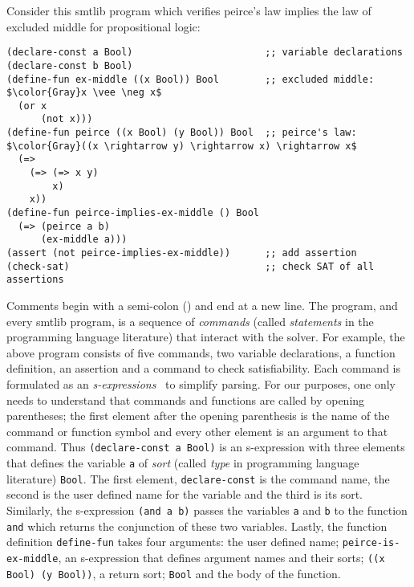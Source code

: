 Consider this \acl{smtlib} program
which verifies peirce's law implies the law of excluded middle for propositional
logic:
%
\begin{lstlisting}[columns=flexible,keepspaces=true,language=SMTLIB]
(declare-const a Bool)                       ;; variable declarations
(declare-const b Bool)
(define-fun ex-middle ((x Bool)) Bool        ;; excluded middle: $\color{Gray}x \vee \neg x$
  (or x
      (not x)))
(define-fun peirce ((x Bool) (y Bool)) Bool  ;; peirce's law: $\color{Gray}((x \rightarrow y) \rightarrow x) \rightarrow x$
  (=>
    (=> (=> x y)
        x)
    x))
(define-fun peirce-implies-ex-middle () Bool
  (=> (peirce a b)
      (ex-middle a)))
(assert (not peirce-implies-ex-middle))      ;; add assertion
(check-sat)                                  ;; check SAT of all assertions
\end{lstlisting}
%
Comments begin with a semi-colon (\rn{;}) and end at a new line. The program,
and every \acl{smtlib} program, is a sequence of \emph{commands} (called
\emph{statements} in the programming language literature) that interact with the
solver. For example, the above program consists of five commands, two variable
declarations, a function definition, an assertion and a command to check
satisfiability. Each command is formulated as an
\emph{s-expressions}~\cite{10.1145/367177.367199} to simplify parsing. For our
purposes, one only needs to understand that commands and functions are called by
opening parentheses; the first element after the opening parenthesis is the name
of the command or function symbol and every other element is an argument to that
command. Thus \lstinline{(declare-const a Bool)} is an s-expression with three
elements that defines the \pl{} variable \lstinline{a} of \emph{sort} (called
\emph{type} in programming language literature) \lstinline{Bool}. The first
element, \lstinline{declare-const} is the command name, the second is the user
defined name for the variable and the third is its sort. Similarly, the
s-expression \lstinline{(and a b)} passes the variables \lstinline{a} and
\lstinline{b} to the function \lstinline{and} which returns the conjunction of
these two variables. Lastly, the function definition \lstinline{define-fun}
takes four arguments: the user defined name; \lstinline{peirce-is-ex-middle}, an
s-expression that defines argument names and their sorts;
\lstinline{((x Bool) (y Bool))}, a return sort; \lstinline{Bool} and the body of
the function.

